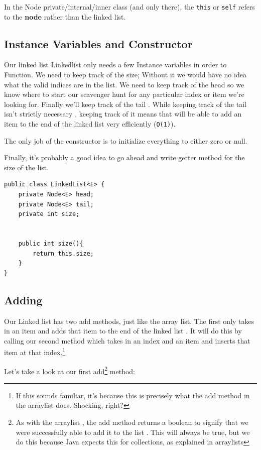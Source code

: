 \documentclass[10pt,a4paper]{book}
\begin{document}
In the Node private/internal/inner class (and only there), the \texttt{this} or \texttt{self} refers to the \textbf{node} rather than the linked list.





\subsection{Instance Variables and Constructor}

Our linked list Linkedlist only needs a few Instance  variables in order to Function. We need to keep track of the size; Without it we would have no idea what the valid indices are in the list. We need to keep track of the head so we know where to start our scavenger hunt for any particular index or item we're looking for.  Finally we'll keep track of the tail . While keeping track of the tail isn't strictly necessary , keeping track of it means that will be able to add an item to the end of the linked list very efficiently (\texttt{O(1)}).

The only job of the constructor is to initialize everything to either zero or null.

Finally, it's probably a good idea to go ahead and write getter method for the size of the list.

\begin{verbatim}
public class LinkedList<E> { 
	private Node<E> head;
	private Node<E> tail;
	private int size;
	
	
	public int size(){
		return this.size;
	}
}
\end{verbatim}






\subsection{Adding}
Our Linked list has two add methods, just like the array list.  The first only takes in an item and adds that item to the end of the linked list . It will do this by calling our second method which takes in an index and an item and inserts that item at that index.\footnote{If this sounds familiar, it's because this is precisely what the add method in the arraylist does. Shocking, right?}

Let's take a look at our first add\footnote{As with the arraylist , the add method returns a boolean to signify that we were successfully able to add it to the list . This will always be true, but we do this because Java expects this for collections, as explained in arraylists } method:
\end{document}
